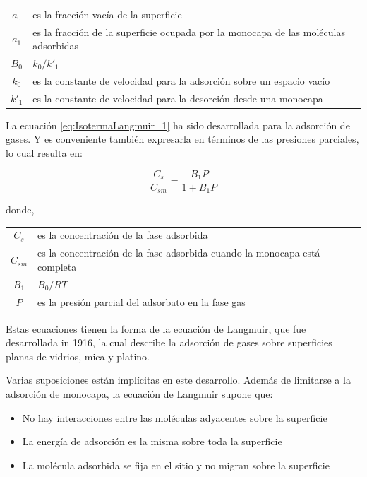 \documentclass[11pt]{book}
\begin{document}
\begin{tabular}{c p{15cm}} 
    $a_0$ &  es la fracción vacía de la superficie\\
    $a_1$ &  es la fracción de la superficie ocupada por la monocapa de las moléculas adsorbidas \\
    $B_0$ &  $k_0/k'_1$ \\
    $k_0$ &  es la constante de velocidad para la adsorción sobre un espacio vacío \\
    $k'_1$ & es la constante de velocidad para la desorción desde una monocapa
\end{tabular}

La ecuación \ref{eq:IsotermaLangmuir_1} ha sido desarrollada para la adsorción de gases. Y es conveniente también expresarla en términos de las presiones parciales, lo cual resulta en:

\begin{equation}
    \label{eq:IsotermaLangmuir_2}
    \frac{C_s}{C_{sm}}= \frac{B_1 P}{1 + B_1 P}
\end{equation}

donde,

\begin{tabular}{c p{15cm}} 
    $C_s$    &  es la concentración de la fase adsorbida\\
    $C_{sm}$ &  es la concentración de la fase adsorbida cuando la monocapa está completa \\
    $B_1$    &  $B_0/RT$ \\
    $P$      &  es la presión parcial del adsorbato en la fase gas
\end{tabular}

Estas ecuaciones tienen la forma de la ecuación de Langmuir, que fue desarrollada in 1916, la cual describe la adsorción de gases sobre superficies planas de vidrios, mica y platino. 

Varias suposiciones están implícitas en este desarrollo. Además de limitarse a la adsorción de monocapa, la ecuación de Langmuir supone que:

\begin{itemize}
    \item No hay interacciones entre las moléculas adyacentes sobre la superficie

    \item La energía de adsorción es la misma sobre toda la superficie

    \item La molécula adsorbida se fija en el sitio y no migran sobre la superficie

\end{itemize}
\end{document}
